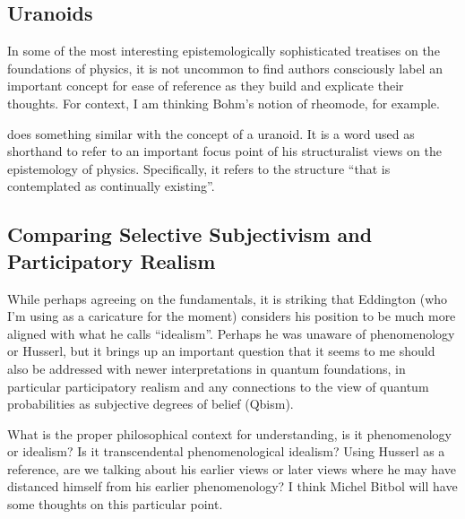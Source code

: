 \subsection{Uranoids}

In some of the most interesting epistemologically sophisticated treatises on the foundations of physics, it is not uncommon to find authors consciously label an important concept for ease of reference as they build and explicate their thoughts.  For context, I am thinking Bohm's notion of rheomode, for example.

\cite{Eddington1939} does something similar with the concept of a uranoid.  It is a word used as shorthand to refer to an important focus point of his structuralist views on the epistemology of physics.  Specifically, it refers to the structure ``that is contemplated as continually existing''.  \citep[p. 166]{Eddington1939}




\subsection{Comparing Selective Subjectivism and Participatory Realism}

While perhaps agreeing on the fundamentals, it is striking that Eddington (who I'm using as a caricature for the moment) considers his position to be much more aligned with what he calls ``idealism''.  Perhaps he was unaware of phenomenology or Husserl, but it brings up an important question that it seems to me should also be addressed with newer interpretations in quantum foundations, in particular participatory realism and any connections to the view of quantum probabilities as subjective degrees of belief (Qbism).

What is the proper philosophical context for understanding, is it phenomenology or idealism?  Is it transcendental phenomenological idealism?  Using Husserl as a reference, are we talking about his earlier views or later views where he may have distanced himself from his earlier phenomenology?  I think Michel Bitbol will have some thoughts on this particular point.







